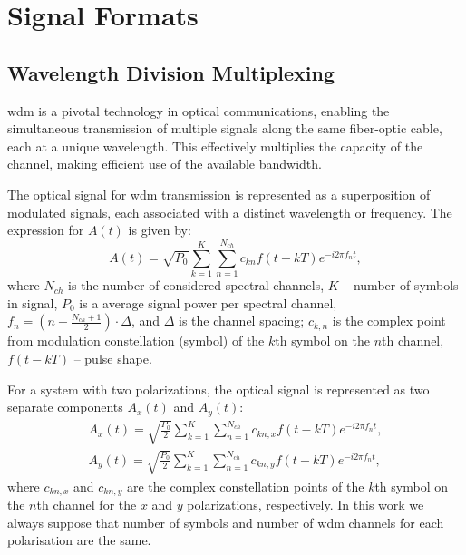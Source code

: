 





\section{Signal Formats}
\label{sec:signals}

\subsection{Wavelength Division Multiplexing}
\acrfull{wdm} is a pivotal technology in optical communications, enabling the simultaneous transmission of multiple signals along the same fiber-optic cable, each at a unique wavelength. This effectively multiplies the capacity of the channel, making efficient use of the available bandwidth.

The optical signal  for \Gls{wdm} transmission is represented as a superposition of modulated signals, each associated with a distinct wavelength or frequency. The expression for 
$A(t)$ is given by:
\begin{equation}
A(t)=\sqrt{P_0} \sum_{k=1}^K \sum_{n=1}^{N_{ch}}  c_{kn}   f(t-kT)  e^{-i 2 \pi f_n t},
\label{eq:wdm_nlse}
\end{equation}
where $N_{ch}$ is the number of considered spectral channels, $K$ -- number of symbols in signal, $P_0$ is a average signal power per spectral channel, $f_n=\left(n - \frac{N_{ch}+1}{2}\right) \cdot \Delta$, and $\Delta$ is the channel spacing; $c_{k,n}$ is the complex point from modulation constellation (symbol) of the $k$th symbol on the $n$th channel, $f(t-kT)$ -- pulse shape.

For a system with two polarizations, the optical signal is represented as two separate components $A_x(t)$ and $A_y(t)$:
\begin{eqnarray}
A_x(t)=\sqrt{\frac{P_0}{2}} \sum_{k=1}^K \sum_{n=1}^{N_{ch}}  c_{kn,x} f(t-kT)  e^{-i 2 \pi f_n t}, \nonumber \\
A_y(t)=\sqrt{\frac{P_0}{2}} \sum_{k=1}^K \sum_{n=1}^{N_{ch}}  c_{kn,y} f(t-kT)  e^{-i 2 \pi f_n t}, 
\label{eq:wdm_manakov}
\end{eqnarray}
where $c_{kn,x}$ and $c_{kn,y}$ are the complex constellation points of the 
$k$th symbol on the 
$n$th channel for the $x$ and $y$ polarizations, respectively.
In this work we always suppose that number of symbols and number of \acrshort{wdm} channels for each polarisation are the same. 


